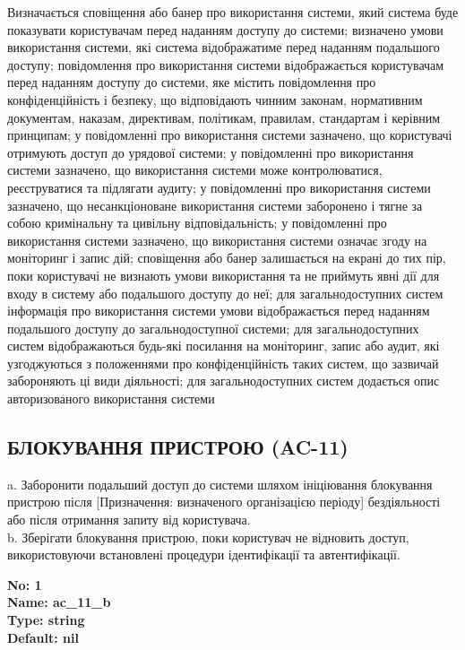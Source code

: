 \documentclass{article}
\begin{document}
{\footnotesize Визначається сповіщення або банер про використання системи, який система буде показувати користувачам перед наданням доступу до системи; визначено умови використання системи, які система відображатиме перед наданням подальшого доступу; повідомлення про використання системи відображається користувачам перед наданням доступу до системи, яке містить повідомлення про конфіденційність і безпеку, що відповідають чинним законам, нормативним документам, наказам, директивам, політикам, правилам, стандартам і керівним принципам; у повідомленні про використання системи зазначено, що користувачі отримують доступ до урядової системи; у повідомленні про використання системи зазначено, що використання системи може контролюватися, реєструватися та підлягати аудиту; у повідомленні про використання системи зазначено, що несанкціоноване використання системи заборонено і тягне за собою кримінальну та цивільну відповідальність; у повідомленні про використання системи зазначено, що використання системи означає згоду на моніторинг і запис дій; сповіщення або банер залишається на екрані до тих пір, поки користувачі не визнають умови використання та не приймуть явні дії для входу в систему або подальшого доступу до неї; для загальнодоступних систем інформація про використання системи умови відображається перед наданням подальшого доступу до загальнодоступної системи; для загальнодоступних систем відображаються будь-які посилання на моніторинг, запис або аудит, які узгоджуються з положеннями про конфіденційність таких систем, що зазвичай забороняють ці види діяльності; для загальнодоступних систем додається опис авторизованого використання системи}




\subsection{БЛОКУВАННЯ ПРИСТРОЮ (AC-11)}
a. Заборонити подальший доступ до системи шляхом ініціювання блокування пристрою після [Призначення: визначеного організацією періоду] бездіяльності або після отримання запиту від користувача.\\ 
b. Зберігати блокування пристрою, поки користувач не відновить доступ, використовуючи встановлені процедури ідентифікації та автентифікації.

\vspace{10pt}
{\footnotesize\bfseries
No: 1\\
Name: ac\_\allowbreak{}11\_\allowbreak{}b\\
Type: string\\
Default: nil
}
\end{document}
